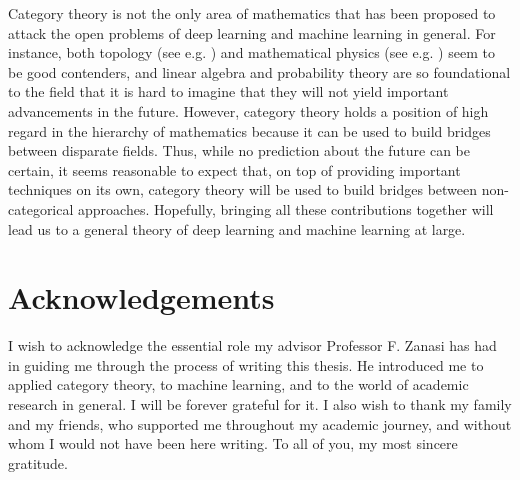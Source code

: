 \documentclass[11pt,a4paper,openright,twoside]{report}
\theoremstyle{plain}
\theoremstyle{definition}
\begin{document}
Category theory is not the only area of mathematics that has been proposed to attack the open problems of deep learning and machine learning in general. For instance, both topology (see e.g. \cite{hensel2021survey}) and mathematical physics (see e.g. \cite{roberts2022principles}) seem to be good contenders, and linear algebra and probability theory are so foundational to the field that it is hard to imagine that they will not yield important advancements in the future. However, category theory holds a position of high regard in the hierarchy of mathematics because it can be used to build bridges between disparate fields. Thus, while no prediction about the future can be certain, it seems reasonable to expect that, on top of providing important techniques on its own, category theory will be used to build bridges between non-categorical approaches. Hopefully, bringing all these contributions together will lead us to a general theory of deep learning and machine learning at large.

\clearpage{\pagestyle{empty}\cleardoublepage}



{}

\clearpage{\pagestyle{empty}\cleardoublepage}


\chapter*{Acknowledgements}

\thispagestyle{empty}

I wish to acknowledge the essential role my advisor Professor F. Zanasi has had in guiding me through the process of writing this thesis. He introduced me to applied category theory, to machine learning, and to the world of academic research in general. I will be forever grateful for it. I also wish to thank my family and my friends, who supported me throughout my academic journey, and without whom I would not have been here writing. To all of you, my most sincere gratitude.
\end{document}

